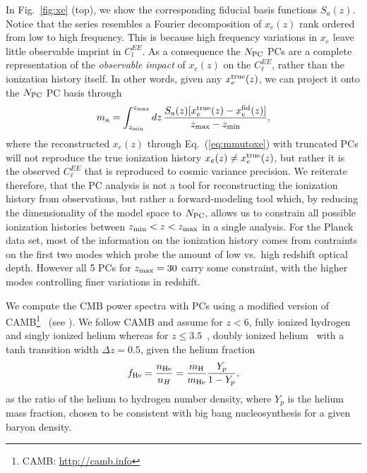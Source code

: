 \documentclass[prd,twocolumn,amsmath,amssymb,floatfix,superscriptaddress,nofootinbib]{revtex4-1}
\newcommand{\xef}{x_e^{\rm fid}}
\newcommand{\zmax}{z_{\rm max}}
\newcommand{\zmin}{z_{\rm min}}
\newcommand{\beq}{\begin{equation}}
\newcommand{\eeq}{\end{equation}}
\newcommand{\todo}[1]{\textcolor{darkgreen}{\bf{#1}}}
\begin{document}
 
 
 
 In Fig.~\ref{fig:xe} (top), we show the corresponding fiducial basis functions $S_a(z)$.  
Notice that the series resembles a Fourier decomposition of $x_e(z)$ rank ordered from low to high frequency.
This is because high frequency variations in $x_e$ leave little observable imprint in $C_l^{EE}$.  
As a consequence  the $N_{\rm PC}$ PCs are a complete representation of the \textit{observable impact} of $x_e(z)$ on the $C_\ell^{EE}$, rather than the ionization history itself. In other words, 
given any $x_e^{\rm true}(z)$, we can project it onto the $N_{\rm PC}$ PC basis through
\begin{equation}
m_{a}=
  \int _{\zmin}^{\zmax} dz\, \frac{S_{a}(z) [x_e^{\rm true}(z)-\xef(z)]}{\zmax-\zmin},
\label{eq:xetommu}
\end{equation}
%
where the reconstructed $x_e(z)$ through Eq.~(\ref{eq:mmutoxe}) with truncated PCs will not reproduce the true ionization history $x_e(z) \neq x_e^{\rm true}(z)$, but rather it is the observed $C_\ell^{EE}$ that is reproduced to cosmic variance precision. We reiterate therefore, that the PC analysis is not a tool for reconstructing the ionization history from observations, but rather a forward-modeling tool which, by reducing the dimensionality of the model space to $N_{\rm PC}$, allows us to constrain all possible ionization histories between $z_{\rm min}<z<z_{\rm max}$ in a single analysis.
For the Planck data set, most of the information on the ionization history comes from contraints on the first two modes which probe the amount of low vs.\ high redshift optical depth.   However all 5 PCs for $z_{\rm max}=30$ carry some constraint, with the higher modes controlling finer variations in redshift.

 We  compute the CMB power spectra with PCs using a modified version of CAMB\footnote{CAMB: \url{http://camb.info}}~\cite{Lewis:1999bs, Howlett:2012mh} (see \cite{Heinrich:2016ojb}).
 We follow CAMB and assume for $z<6$, fully ionized hydrogen and singly ionized helium whereas for $z\leq 3.5$~\cite{Becker:2010cu}, doubly ionized helium~\cite{Becker:2010cu} with a tanh transition width $\Delta z = 0.5$, given the helium fraction
 \beq
 f_{\rm He} = \frac{n_{\rm He}}{n_{H}} = \frac{m_{\rm H}}{m_{\rm He}} \frac{Y_p}{1 - Y_p}, 
 \eeq
as the ratio of the helium to hydrogen number density, where $Y_p$ is the helium mass fraction, chosen to be consistent with big bang nucleosynthesis for a given baryon density. 
\end{document}
